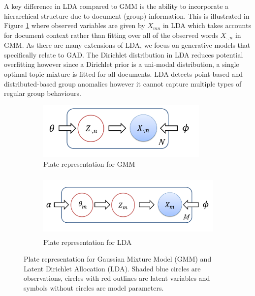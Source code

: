  
  A key difference in LDA compared to GMM is  the ability to incorporate a hierarchical structure due to document (group) information. This is illustrated in Figure \ref{Fig:GMMvsLDA} where observed variables are given by $X_{mn}$ in LDA which takes accounts for document context rather than fitting over all of the observed words $X_{\cdot,n}$ in GMM.  %
As there are many extensions of LDA, we focus on generative models that  specifically relate to  GAD. %
The Dirichlet distribution in LDA reduces potential overfitting however since a Dirichlet prior is a uni-modal distribution,  a single optimal topic mixture is fitted for all documents. LDA detects point-based and  distributed-based group anomalies however  it cannot capture multiple types of regular group behaviours.



\begin{figure}[!t]
    \centering
      \begin{subfigure}[H]{0.8\textwidth}
        \centering
        \includegraphics[width=0.75\linewidth, height=2.8cm,
        trim=0cm 0.2cm 1cm 0cm]{FIGURES/GMM}
        \caption{Plate representation for GMM }
    \end{subfigure}
    \begin{subfigure}[H]{0.8\textwidth}
        \centering
        \includegraphics[width=0.9\linewidth, height=3.2cm,
        trim=0cm 0.5cm 1.2cm 0cm%
        ]{FIGURES/LDA}
        \caption{Plate representation for LDA }
    \end{subfigure}%
    \caption{ Plate representation for  Gaussian Mixture Model (GMM) and Latent Dirichlet Allocation (LDA).
Shaded blue circles are observations, circles with red outlines are latent variables and symbols without circles are model parameters. %
     }
     \label{Fig:GMMvsLDA} 
\end{figure}

